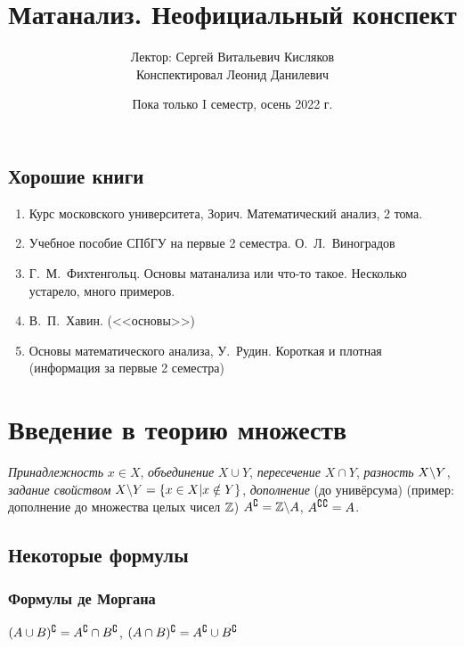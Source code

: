 \documentclass[a4paper]{report}
\date{Пока только I семестр, осень 2022 г.}
\title{Матанализ. Неофициальный конспект}
\author{Лектор: Сергей Витальевич Кисляков\\ Конспектировал Леонид Данилевич}
\begin{document}
    \maketitle
    \tableofcontents
    \newpage
    \setcounter{lection}{0}

    \section*{Хорошие книги}

    \begin{enumerate}
        \item Курс московского университета, Зорич.
        Математический анализ, 2 тома.
        \item Учебное пособие СПбГУ на первые 2 семестра.
        О.\ Л.\ Виноградов
        \item Г.\ М.\ Фихтенгольц.
        Основы матанализа или что-то такое.
        Несколько устарело, много примеров.
        \item В.\ П.\ Хавин. (<<основы>>)
        \item Основы математического анализа, У.\ Рудин.
        Короткая и плотная (информация за первые 2 семестра)
    \end{enumerate}


    \chapter{Введение в теорию множеств}


    \emph{Принадлежность} $x \in X$, \emph{объединение} $X \cup Y$, \emph{пересечение} $X \cap Y$, \emph{разность} $X \backslash Y$, \emph{задание свойством} $X \backslash Y = \{ x \in X | x \notin Y \}$, \emph{дополнение} (до унивёрсума) (пример: дополнение до множества целых чисел $\mathbb{Z}$) $A{}^\complement = \mathbb{Z} \backslash A$, $A{}^\complement{}^\complement = A$.


    \section{Некоторые формулы}

    \subsection{Формулы де Моргана}
    $(A\cup B){}^\complement = A{}^\complement \cap B{}^\complement$, $(A\cap B){}^\complement = A{}^\complement \cup B{}^\complement$

\end{document}
